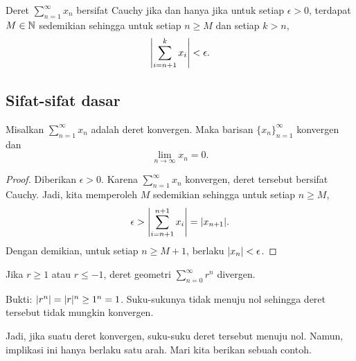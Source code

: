 \begin{prop} \label{prop:cachyser}
Deret $\sum_{n=1}^\infty x_n$ bersifat Cauchy
jika dan hanya jika untuk setiap $\epsilon > 0$, 
terdapat $M \in {\mathbb{N}}$ sedemikian sehingga untuk setiap $n \geq M$
dan setiap $k > n$,
\begin{equation*}
\left\lvert { \sum_{i={n+1}}^k x_i } \right\rvert
< \epsilon .
\end{equation*}
\end{prop}

\subsection{Sifat-sifat dasar}

\begin{prop}
Misalkan $\sum_{n=1}^\infty x_n$ adalah deret konvergen.  Maka
barisan $\{ x_n \}_{n=1}^\infty$ konvergen dan
\begin{equation*}
\lim_{n\to\infty} x_n = 0.
\end{equation*}
\end{prop}

\begin{proof}
Diberikan $\epsilon > 0$.  Karena $\sum_{n=1}^\infty x_n$ konvergen, deret tersebut bersifat Cauchy.
Jadi, kita memperoleh $M$ sedemikian sehingga untuk setiap $n \geq M$,
\begin{equation*}
\epsilon > 
\left\lvert { \sum_{i={n+1}}^{n+1} x_i } \right\rvert
=
\lvert { x_{n+1} } \rvert .
\end{equation*}
Dengan demikian, untuk setiap $n \geq M+1$, berlaku $\lvert {x_{n}} \rvert < \epsilon$.
\end{proof}

\begin{example}
Jika $r \geq 1$ atau $r \leq -1$, deret geometri $\sum_{n=0}^\infty r^n$
divergen.

Bukti: $\lvert {r^n} \rvert = \lvert {r} \rvert^n \geq 1^n = 1$.  Suku-sukunya tidak menuju nol
sehingga deret tersebut tidak mungkin konvergen.
\end{example}

Jadi, jika suatu deret konvergen, suku-suku deret tersebut menuju nol.
Namun, implikasi ini hanya berlaku satu arah.
Mari kita berikan sebuah contoh.


